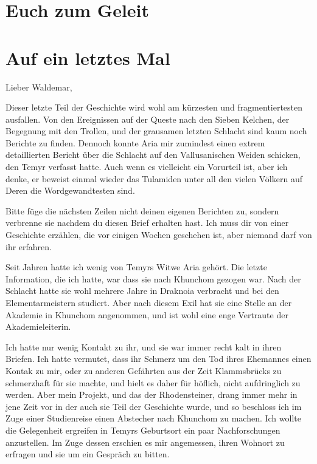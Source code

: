 \chapter{Euch zum Geleit}

\chapter{Auf ein letztes Mal}

Lieber Waldemar,

Dieser letzte Teil der Geschichte wird wohl am kürzesten und fragmentiertesten ausfallen. Von den Ereignissen auf der Queste nach den Sieben Kelchen, der Begegnung mit den Trollen, und der grausamen letzten Schlacht sind kaum noch Berichte zu finden.
Dennoch konnte Aria mir zumindest einen extrem detaillierten Bericht über die Schlacht auf den Vallusanischen Weiden schicken, den Temyr verfasst hatte.
Auch wenn es vielleicht ein Vorurteil ist, aber ich denke, er beweist einmal wieder das Tulamiden unter all den vielen Völkern auf Deren die Wordgewandtesten sind.

Bitte füge die nächsten Zeilen nicht deinen eigenen Berichten zu, sondern verbrenne sie nachdem du diesen Brief erhalten hast. Ich muss dir von einer Geschichte erzählen, die vor einigen Wochen geschehen ist, aber niemand darf von ihr erfahren.

Seit Jahren hatte ich wenig von Temyrs Witwe Aria gehört. Die letzte Information, die ich hatte, war dass sie nach Khunchom gezogen war. Nach der Schlacht hatte sie wohl mehrere Jahre in Draknoia verbracht und bei den Elementarmeistern studiert. Aber nach diesem Exil hat sie eine Stelle an der Akademie in Khunchom angenommen, und ist wohl eine enge Vertraute der Akademieleiterin.

Ich hatte nur wenig Kontakt zu ihr, und sie war immer recht kalt in ihren Briefen. Ich hatte vermutet, dass ihr Schmerz um den Tod ihres Ehemannes einen Kontak zu mir, oder zu anderen Gefährten aus der Zeit Klammsbrücks zu schmerzhaft für sie machte, und hielt es daher für höflich, nicht aufdringlich zu werden.
Aber mein Projekt, und das der Rhodensteiner, drang immer mehr in jene Zeit vor in der auch sie Teil der Geschichte wurde, und so beschloss ich im Zuge einer Studienreise einen Abstecher nach Khunchom zu machen. Ich wollte die Gelegenheit ergreifen in Temyrs Geburtsort ein paar Nachforschungen anzustellen. Im Zuge dessen erschien es mir angemessen, ihren Wohnort zu erfragen und sie um ein Gespräch zu bitten.

